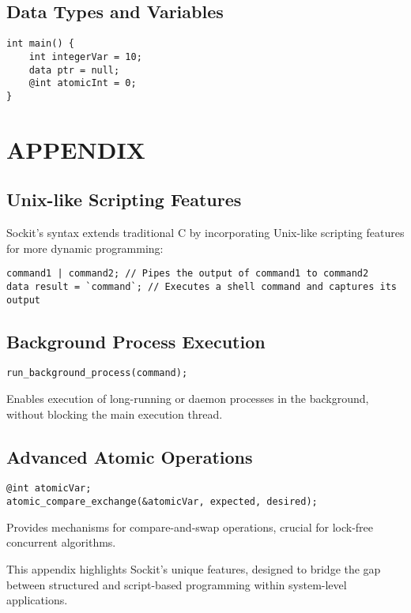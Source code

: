 \documentclass[12pt,a4paper]{article} %
\begin{document}
\subsection{Data Types and Variables}
\begin{verbatim}
int main() {
    int integerVar = 10;
    data ptr = null;
    @int atomicInt = 0;
}
\end{verbatim}

\appendix
\section*{APPENDIX}

\subsection*{Unix-like Scripting Features}
Sockit's syntax extends traditional C by incorporating Unix-like scripting features for more dynamic programming:
\begin{verbatim}
command1 | command2; // Pipes the output of command1 to command2
data result = `command`; // Executes a shell command and captures its output
\end{verbatim}

\subsection*{Background Process Execution}
\begin{verbatim}
run_background_process(command);
\end{verbatim}
Enables execution of long-running or daemon processes in the background, without blocking the main execution thread.

\subsection*{Advanced Atomic Operations}
\begin{verbatim}
@int atomicVar;
atomic_compare_exchange(&atomicVar, expected, desired);
\end{verbatim}
Provides mechanisms for compare-and-swap operations, crucial for lock-free concurrent algorithms.

This appendix highlights Sockit's unique features, designed to bridge the gap between structured and script-based programming within system-level applications.
\end{document}
